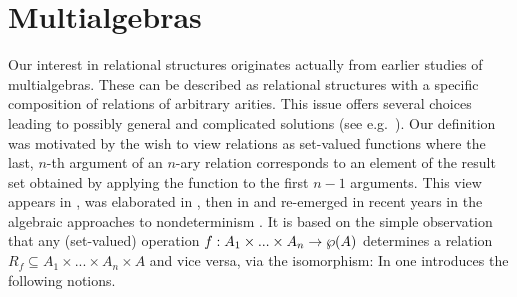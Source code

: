 \documentclass[10pt]{article}
\begin{document}

\section{Multialgebras}
\label{se:mult}
Our interest in relational structures originates actually from earlier studies
of multialgebras. These can be described as relational structures with
a specific composition
of relations of arbitrary arities. This issue offers several
choices leading to possibly general and complicated solutions (see
e.g.\ \cite{glenn,Topen:93}).  Our definition  was motivated by
the wish to view relations as set-valued functions where the last,
$n$-th argument of an $n$-ary relation corresponds to an element of
the result set obtained by applying the function to the first $n-1$
arguments.  This view appears in \cite{c:101}, was elaborated in
\cite{JT1,JT2}, then in \cite{c:102} and re-emerged in recent years in
the algebraic approaches to nondeterminism
\cite{c:64,c:59,c:Bia1,c:130,survey}.  It is based on the
simple observation that any (set-valued) operation
$f:A_1\times...\times A_n\rightarrow \wp(A)$ determines a relation
$R_f\subseteq A_1\times...\times A_n\times A$ and vice versa, via the
isomorphism: 
%
%
In \cite{JT1,BJ} one introduces the following notions.
\end{document}
